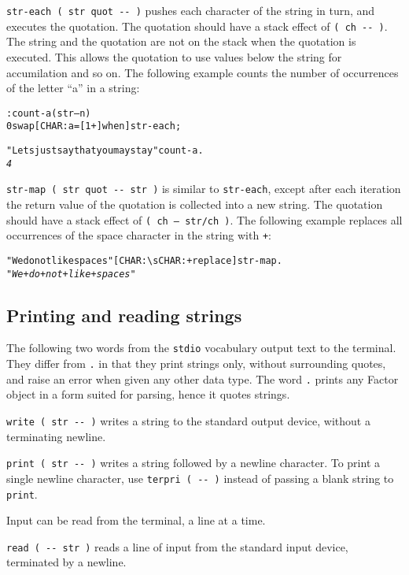 \documentclass[english]{article}
\begin{document}
\texttt{str-each ( str quot -{}- )} pushes each character of the string in turn, and executes the quotation. The quotation should have a stack effect of \texttt{( ch -{}- )}. The string and the quotation are not on the stack when the quotation is executed. This allows the quotation to use values below the string for accumilation and so on. The following example counts the number of occurrences of the letter ``a'' in a string:

\begin{alltt}
: count-a ( str -- n )
    0 swap [ CHAR: a = [ 1 + ] when ] str-each ;

"Lets just say that you may stay" count-a .
\emph{4}
\end{alltt}

\texttt{str-map ( str quot -{}- str )} is similar to \texttt{str-each}, except after each iteration the return value of the quotation is collected into a new string. The quotation should have a stack effect of \texttt{( ch -- str/ch )}. The following example replaces all occurrences of the space character in the string with \texttt{+}:

\begin{alltt}
"We do not like spaces" [ CHAR: \textbackslash{}s CHAR: + replace ] str-map .
\emph{"We+do+not+like+spaces"}
\end{alltt}

\subsection{Printing and reading strings}

The following two words from the \texttt{stdio} vocabulary output text to the terminal. They differ from \texttt{.}
in that they print strings only, without surrounding quotes, and raise
an error when given any other data type. The word \texttt{.} prints any Factor
object in a form suited for parsing, hence it quotes strings.

\texttt{write ( str -{}- )} writes a string to the standard output
device, without a terminating newline.

\texttt{print ( str -{}- )} writes a string followed by a newline
character. To print a single newline character, use \texttt{terpri (
-{}- )} instead of passing a blank string to \texttt{print}.

Input can be read from the terminal, a line at a time.

\texttt{read ( -{}- str )} reads a line of input from the standard
input device, terminated by a newline.
\end{document}
